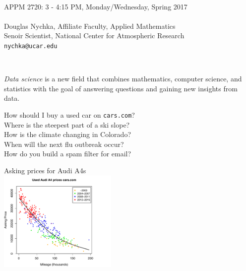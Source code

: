 \documentclass[12pt]{article}
\begin{document}
\vspace*{-1.5in}
{\sf
{ 
\color{grey40}
\hspace*{-.5in} \fontsize{35}{50}\selectfont{ 
Introduction to Data Analysis  
with R 
}
}
\\

\begin{minipage}{7in}{\Large 
APPM 2720:  3 - 4:15 PM, Monday/Wednesday,  Spring 2017  \\ \\
 Douglas Nychka, 
Affiliate Faculty, Applied Mathematics  \\
Senoir Scientist, National Center for Atmospheric Research \\
\verb+nychka@ucar.edu+
 }
 \end{minipage}
\\

\begin{minipage}{6.75in}
{\Large 
{\it Data science}  is a new field that combines mathematics, computer science, and statistics with the goal of
answering questions and gaining new insights from data. 
}
\end{minipage}



\begin{minipage}{4in}
\vspace*{0in}
{
\bdot How should I buy  a used car on {\tt cars.com}? \\[.125in]
\bdot Where is the steepest part of a ski slope? \\[.125in] 
\bdot How is the climate changing in Colorado? \\[.125in] 
\bdot When will the next flu outbreak occur? \\[.125in] 
\bdot How do you build a spam filter for email?
}
%
\end{minipage}
%
\begin{minipage}{3.75in}
\vspace*{0in}
\hspace*{.375in} Asking prices for Audi A4s \\
\hspace*{.125in}\includegraphics[width=2.25in]{A4.pdf}
\end{minipage}
\\

}
\end{document}
